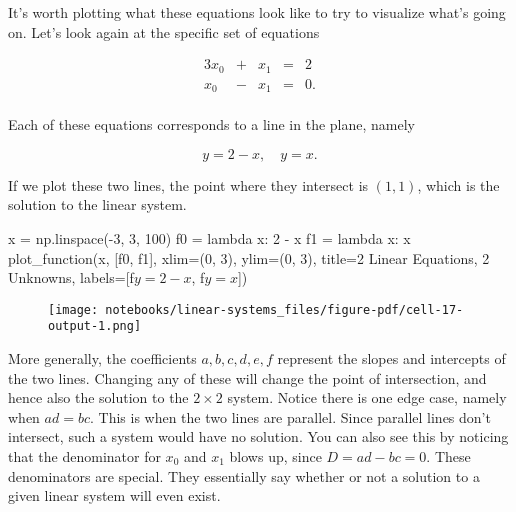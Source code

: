 \documentclass[
  letterpaper,
  DIV=11,
  numbers=noendperiod]{scrreprt}
\newenvironment{Shaded}{\begin{snugshade}}{\end{snugshade}}
\newcommand{\DecValTok}[1]{\textcolor[rgb]{0.68,0.00,0.00}{#1}}
\newcommand{\KeywordTok}[1]{\textcolor[rgb]{0.00,0.23,0.31}{#1}}
\newcommand{\NormalTok}[1]{\textcolor[rgb]{0.00,0.23,0.31}{#1}}
\newcommand{\OperatorTok}[1]{\textcolor[rgb]{0.37,0.37,0.37}{#1}}
\newcommand{\SpecialStringTok}[1]{\textcolor[rgb]{0.13,0.47,0.30}{#1}}
\newcommand{\StringTok}[1]{\textcolor[rgb]{0.13,0.47,0.30}{#1}}
\begin{document}
It's worth plotting what these equations look like to try to visualize
what's going on. Let's look again at the specific set of equations

\begin{alignat*}{3}
   x_0 & {}+{} &  x_1 & {}={} & 2  \\
   x_0 & {}-{} &  x_1 & {}={} & 0. \\
\end{alignat*}

Each of these equations corresponds to a line in the plane, namely

\[y = 2 - x, \quad y = x.\]

If we plot these two lines, the point where they intersect is \((1,1)\),
which is the solution to the linear system.

\begin{Shaded}
\begin{Highlighting}[]
\NormalTok{x }\OperatorTok{=}\NormalTok{ np.linspace(}\OperatorTok{{-}}\DecValTok{3}\NormalTok{, }\DecValTok{3}\NormalTok{, }\DecValTok{100}\NormalTok{)}
\NormalTok{f0 }\OperatorTok{=} \KeywordTok{lambda}\NormalTok{ x: }\DecValTok{2} \OperatorTok{{-}}\NormalTok{ x}
\NormalTok{f1 }\OperatorTok{=} \KeywordTok{lambda}\NormalTok{ x: x}
\NormalTok{plot\_function(x, [f0, f1], xlim}\OperatorTok{=}\NormalTok{(}\DecValTok{0}\NormalTok{, }\DecValTok{3}\NormalTok{), ylim}\OperatorTok{=}\NormalTok{(}\DecValTok{0}\NormalTok{, }\DecValTok{3}\NormalTok{), title}\OperatorTok{=}\StringTok{\textquotesingle{}2 Linear Equations, 2 Unknowns\textquotesingle{}}\NormalTok{,}
\NormalTok{              labels}\OperatorTok{=}\NormalTok{[}\SpecialStringTok{f\textquotesingle{}$y=2{-}x$\textquotesingle{}}\NormalTok{, }\SpecialStringTok{f\textquotesingle{}$y=x$\textquotesingle{}}\NormalTok{])}
\end{Highlighting}
\end{Shaded}

\begin{figure}[H]

{\centering \texttt{[image: notebooks/linear-systems\_files/figure-pdf/cell-17-output-1.png]}

}

\end{figure}

More generally, the coefficients \(a,b,c,d,e,f\) represent the slopes
and intercepts of the two lines. Changing any of these will change the
point of intersection, and hence also the solution to the \(2 \times 2\)
system. Notice there is one edge case, namely when \(ad=bc\). This is
when the two lines are parallel. Since parallel lines don't intersect,
such a system would have no solution. You can also see this by noticing
that the denominator for \(x_0\) and \(x_1\) blows up, since
\(D=ad-bc=0\). These denominators are special. They essentially say
whether or not a solution to a given linear system will even exist.
\end{document}
